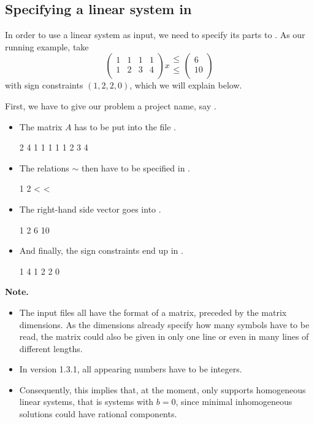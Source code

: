 \subsection{Specifying a linear system in \FourTiTwo}

In order to use a linear system as input, we need to specify its
parts to \FourTiTwo. As our running example, take
\[
\left(
\begin{array}{cccc}
1 & 1 & 1 & 1\\
1 & 2 & 3 & 4\\
\end{array}
\right)x
\begin{array}{c}
\leq\\
\leq\\
\end{array}
\left(
\begin{array}{c}
6\\
10\\
\end{array}
\right)
\]
with sign constraints $(1,2,2,0)$, which we will explain below.

First, we have to give our problem a project name, say
.
\begin{itemize}
\item The matrix $A$ has to be put into the file .
\begin{myverbatim}
2 4
1 1 1 1
1 2 3 4
\end{myverbatim}
\item The relations $\sim$ then have to be specified in .
\begin{myverbatim}
1 2
< <
\end{myverbatim}
\item The right-hand side vector goes into .
\begin{myverbatim}
1 2
6 10
\end{myverbatim}
\item And finally, the sign constraints end up in .
\begin{myverbatim}
1 4
1 2 2 0
\end{myverbatim}
\end{itemize}

{\bf Note.}
\begin{itemize}
\item The input files all have the format of a matrix, preceded by
  the matrix dimensions. As the dimensions already specify how many symbols
  have to be read, the matrix could also be given in only one line or even
  in many lines of different lengths.
\item In \FourTiTwo{} version 1.3.1, all appearing numbers have to be
  integers.
\item Consequently, this implies that, at the moment, 
  only supports homogeneous linear systems, that is systems with
  $b=0$, since minimal inhomogeneous solutions could have rational
  components.
\end{itemize}




